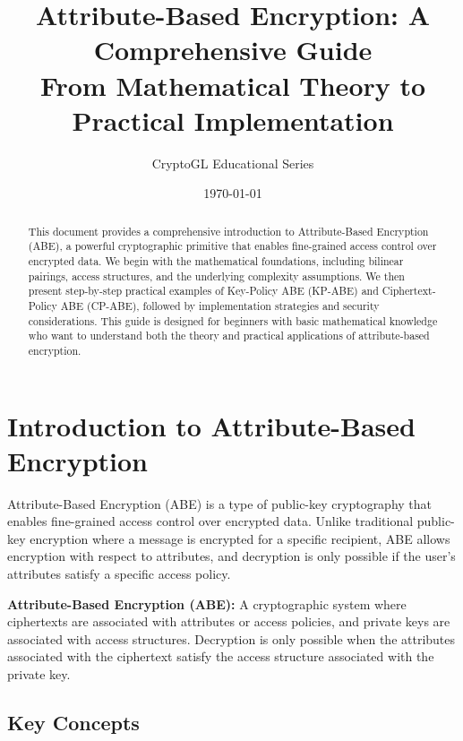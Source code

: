 \documentclass[11pt,a4paper]{article}
\title{\Huge\textbf{Attribute-Based Encryption: A Comprehensive Guide}\\[0.5cm]
\large From Mathematical Theory to Practical Implementation}
\author{CryptoGL Educational Series}
\date{\today}
\begin{document}
\maketitle

\begin{abstract}
This document provides a comprehensive introduction to Attribute-Based Encryption (ABE), a powerful cryptographic primitive that enables fine-grained access control over encrypted data. We begin with the mathematical foundations, including bilinear pairings, access structures, and the underlying complexity assumptions. We then present step-by-step practical examples of Key-Policy ABE (KP-ABE) and Ciphertext-Policy ABE (CP-ABE), followed by implementation strategies and security considerations. This guide is designed for beginners with basic mathematical knowledge who want to understand both the theory and practical applications of attribute-based encryption.
\end{abstract}

\tableofcontents
\newpage

\section{Introduction to Attribute-Based Encryption}

Attribute-Based Encryption (ABE) is a type of public-key cryptography that enables fine-grained access control over encrypted data. Unlike traditional public-key encryption where a message is encrypted for a specific recipient, ABE allows encryption with respect to attributes, and decryption is only possible if the user's attributes satisfy a specific access policy.

\begin{definitionbox}
\textbf{Attribute-Based Encryption (ABE):} A cryptographic system where ciphertexts are associated with attributes or access policies, and private keys are associated with access structures. Decryption is only possible when the attributes associated with the ciphertext satisfy the access structure associated with the private key.
\end{definitionbox}

\subsection{Key Concepts}
\end{document}
